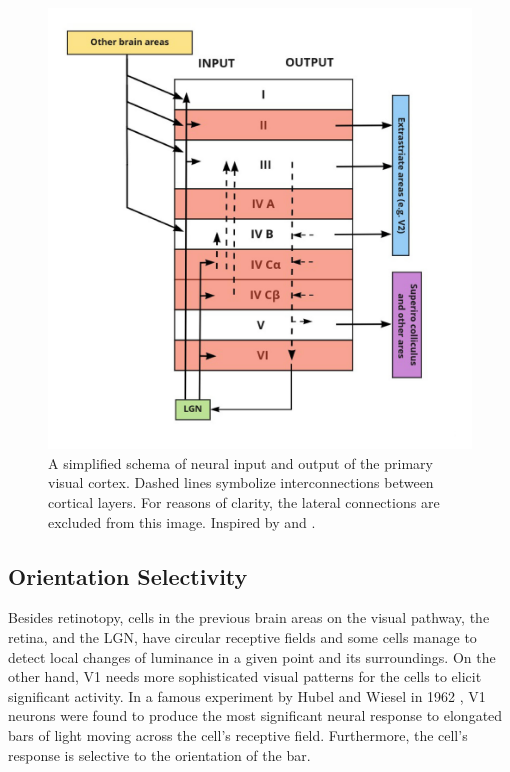 \begin{figure}[H]\centering
	\includegraphics[width=140mm]{../img/final.jpg}
	\caption{A simplified schema of neural input and output of the primary visual cortex. Dashed lines symbolize interconnections between cortical layers. For reasons of clarity, the lateral connections are excluded from this image. Inspired by \citep{bear2020neuroscience} and \citep{kandel2000principles}.}
	\label{img_v1_layers}
\end{figure}


\subsection{Orientation Selectivity}

Besides retinotopy, cells in the previous brain areas on the visual pathway, the retina, and the LGN, have circular receptive fields and some cells manage to detect local changes of luminance in a given point and its surroundings. On the other hand, V1 needs more sophisticated visual patterns for the cells to elicit significant activity. In a famous experiment by Hubel and Wiesel in 1962 \citep{hubel1962receptive}, V1 neurons were found to produce the most significant neural response to elongated bars of light moving across the cell’s receptive field. Furthermore, the cell’s response is selective to the orientation of the bar.

